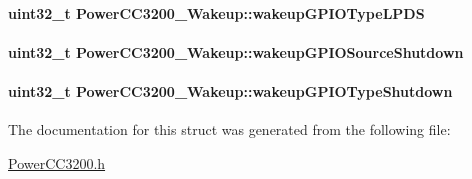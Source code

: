\paragraph[{wakeup\+G\+P\+I\+O\+Type\+L\+P\+D\+S}]{\setlength{\rightskip}{0pt plus 5cm}uint32\+\_\+t Power\+C\+C3200\+\_\+\+Wakeup\+::wakeup\+G\+P\+I\+O\+Type\+L\+P\+D\+S}\label{struct_power_c_c3200___wakeup_adf6932c27b5fca7853c1362f279bb38e}
\paragraph[{wakeup\+G\+P\+I\+O\+Source\+Shutdown}]{\setlength{\rightskip}{0pt plus 5cm}uint32\+\_\+t Power\+C\+C3200\+\_\+\+Wakeup\+::wakeup\+G\+P\+I\+O\+Source\+Shutdown}\label{struct_power_c_c3200___wakeup_aea173877a30709d74376fbbfc7dfa16f}
\paragraph[{wakeup\+G\+P\+I\+O\+Type\+Shutdown}]{\setlength{\rightskip}{0pt plus 5cm}uint32\+\_\+t Power\+C\+C3200\+\_\+\+Wakeup\+::wakeup\+G\+P\+I\+O\+Type\+Shutdown}\label{struct_power_c_c3200___wakeup_a8d9bfd8ed6589bb88d7f70a1dec22bbb}


The documentation for this struct was generated from the following file\+:\begin{DoxyCompactItemize}
\item 
\hyperlink{_power_c_c3200_8h}{Power\+C\+C3200.\+h}\end{DoxyCompactItemize}
